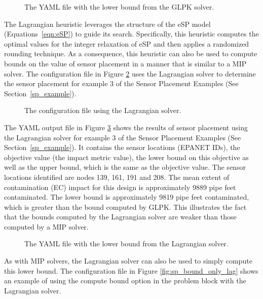 \begin{figure}[h]
  \caption{The  YAML file with the lower bound from the GLPK solver.}
  \label{fig:sp_bound_output}
\end{figure}

The Lagrangian heuristic leverages the structure of the eSP model (Equations~\ref{eqn:eSP}) to
guide its search. Specifically, this heuristic computes the optimal values for the 
integer relaxation of eSP and then applies a randomized rounding technique.
As a consequence, this heuristic can also be used to compute bounds on the value of 
sensor placement in a manner that is similar to a MIP solver.
The configuration file in Figure 
\ref{fig:sp_bound_lag} uses the Lagrangian solver to determine the sensor placement 
for example 3 of the Sensor Placement Examples (See Section~\ref{sp_example}). 

\begin{figure}[h]
  \caption{The  configuration file using the Lagrangian solver.}
  \label{fig:sp_bound_lag}
\end{figure}

The YAML output file in Figure \ref{fig:sp_bound_lag_yaml} shows
the results of sensor placement using the Lagrangian solver for
example 3 of the Sensor Placement Examples (See Section~\ref{sp_example}).
It contains the sensor locations (EPANET IDs), the objective value
(the impact metric value), the lower bound on this objective as
well as the upper bound, which is the same as the objective value.
The sensor locations identified are nodes 139,
161, 191 and 208. The mean extent of contamination (EC) impact for
this design is approximately 9889 pipe feet contaminated. The lower
bound is approximately 9819 pipe feet contaminated, which is greater than the
bound computed by GLPK. This illustrates the fact that the bounds computed
by the Lagrangian solver are weaker than those computed by a MIP solver.

\begin{figure}[h]
  \caption{The  YAML file with the lower bound from the Lagrangian solver.}
  \label{fig:sp_bound_lag_yaml}
\end{figure}

As with MIP solvers, the Lagrangian solver can also be used to simply compute this lower bound.  
The configuration file in Figure \ref{fig:sp_bound_only_lag} shows an example of using the 
compute bound option in the problem block with the Lagrangian solver.


